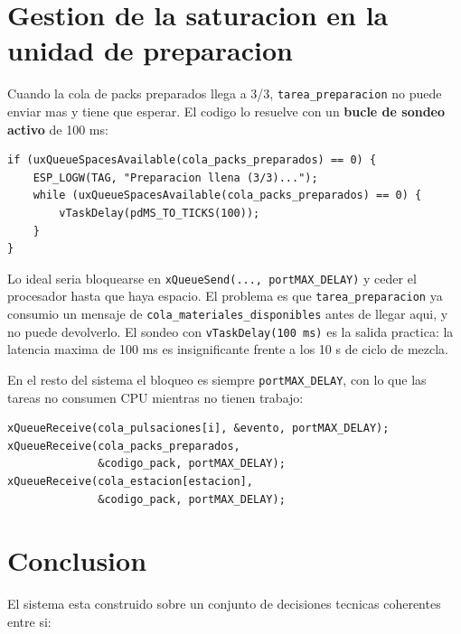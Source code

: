 \documentclass[12pt,a4paper]{article}
\begin{document}
\section{Gestion de la saturacion en la unidad de preparacion}

Cuando la cola de packs preparados llega a 3/3, \texttt{tarea\_preparacion} no puede enviar mas y tiene que esperar. El codigo lo resuelve con un \textbf{bucle de sondeo activo} de 100 ms:

\begin{lstlisting}
if (uxQueueSpacesAvailable(cola_packs_preparados) == 0) {
    ESP_LOGW(TAG, "Preparacion llena (3/3)...");
    while (uxQueueSpacesAvailable(cola_packs_preparados) == 0) {
        vTaskDelay(pdMS_TO_TICKS(100));
    }
}
\end{lstlisting}

\begin{sloppypar}
Lo ideal seria bloquearse en \texttt{xQueueSend(..., portMAX\_DELAY)} y ceder el procesador hasta que haya espacio. El problema es que \texttt{tarea\_preparacion} ya consumio un mensaje de \texttt{cola\_materiales\_}\allowbreak\texttt{disponibles} antes de llegar aqui, y no puede devolverlo. El sondeo con \texttt{vTaskDelay(100 ms)} es la salida practica: la latencia maxima de 100 ms es insignificante frente a los 10 s de ciclo de mezcla.
\end{sloppypar}

En el resto del sistema el bloqueo es siempre \texttt{portMAX\_DELAY}, con lo que las tareas no consumen CPU mientras no tienen trabajo:

\begin{lstlisting}
xQueueReceive(cola_pulsaciones[i], &evento, portMAX_DELAY);
xQueueReceive(cola_packs_preparados,
              &codigo_pack, portMAX_DELAY);
xQueueReceive(cola_estacion[estacion],
              &codigo_pack, portMAX_DELAY);
\end{lstlisting}

\section{Conclusion}

El sistema esta construido sobre un conjunto de decisiones tecnicas coherentes entre si:
\end{document}
